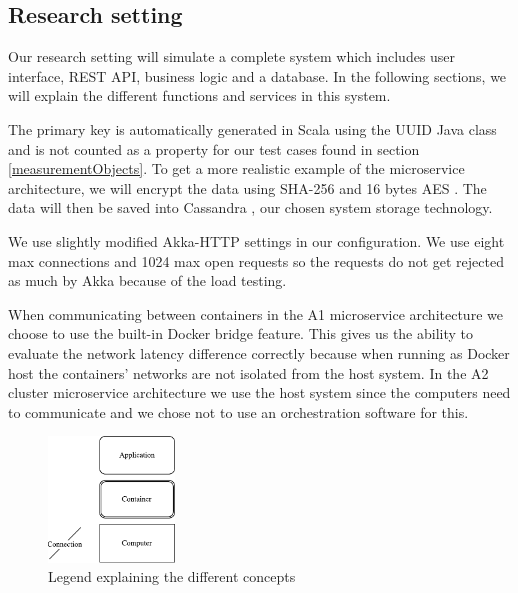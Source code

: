 \documentclass[a4paper,oneside]{bth}
\begin{document}
\subsection{Research setting} \label{researchSetting}

Our research setting will simulate a complete system which includes user interface, REST API, business logic and a database. In the following sections, we will explain the different functions and services in this system.

\par\vspace {0.5cm}
The primary key is automatically generated in Scala \cite{Scala} using the UUID Java class \cite{uuid} and is not counted as a property for our test cases found in section \ref{measurementObjects}. To get a more realistic example of the microservice architecture, we will encrypt the data using SHA-256 \cite{SHA} and 16 bytes AES \cite{AES}. The data will then be saved into Cassandra \cite{Cassandra}, our chosen system storage technology.

\par\vspace {0.5cm}
We use slightly modified Akka-HTTP settings in our configuration.
We use eight max connections and 1024 max open requests so the requests do not get rejected as much by Akka because of the load testing.

\par\vspace {0.5cm}
When communicating between containers in the A1 microservice architecture we choose to use the built-in Docker bridge feature. This gives us the ability to evaluate the network latency difference correctly because when running as Docker host the containers’ networks are not isolated from the host system. In the A2 cluster microservice architecture we use the host system since the computers need to communicate and we chose not to use an orchestration software for this.

\begin{figure}
\begin{center}

\includegraphics[width=0.3\textwidth]{Legend}
\caption{Legend explaining the different concepts}
\label{fig:Legend}

\end{center}
\end{figure}
\end{document}
